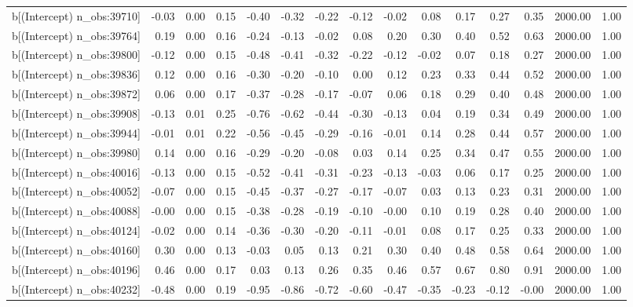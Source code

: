 \begin{table}[ht]
\begin{tabular}{rrrrrrrrrrrrrrr}
  b[(Intercept) n\_obs:39710] & -0.03 & 0.00 & 0.15 & -0.40 & -0.32 & -0.22 & -0.12 & -0.02 & 0.08 & 0.17 & 0.27 & 0.35 & 2000.00 & 1.00 \\ 
  b[(Intercept) n\_obs:39764] & 0.19 & 0.00 & 0.16 & -0.24 & -0.13 & -0.02 & 0.08 & 0.20 & 0.30 & 0.40 & 0.52 & 0.63 & 2000.00 & 1.00 \\ 
  b[(Intercept) n\_obs:39800] & -0.12 & 0.00 & 0.15 & -0.48 & -0.41 & -0.32 & -0.22 & -0.12 & -0.02 & 0.07 & 0.18 & 0.27 & 2000.00 & 1.00 \\ 
  b[(Intercept) n\_obs:39836] & 0.12 & 0.00 & 0.16 & -0.30 & -0.20 & -0.10 & 0.00 & 0.12 & 0.23 & 0.33 & 0.44 & 0.52 & 2000.00 & 1.00 \\ 
  b[(Intercept) n\_obs:39872] & 0.06 & 0.00 & 0.17 & -0.37 & -0.28 & -0.17 & -0.07 & 0.06 & 0.18 & 0.29 & 0.40 & 0.48 & 2000.00 & 1.00 \\ 
  b[(Intercept) n\_obs:39908] & -0.13 & 0.01 & 0.25 & -0.76 & -0.62 & -0.44 & -0.30 & -0.13 & 0.04 & 0.19 & 0.34 & 0.49 & 2000.00 & 1.00 \\ 
  b[(Intercept) n\_obs:39944] & -0.01 & 0.01 & 0.22 & -0.56 & -0.45 & -0.29 & -0.16 & -0.01 & 0.14 & 0.28 & 0.44 & 0.57 & 2000.00 & 1.00 \\ 
  b[(Intercept) n\_obs:39980] & 0.14 & 0.00 & 0.16 & -0.29 & -0.20 & -0.08 & 0.03 & 0.14 & 0.25 & 0.34 & 0.47 & 0.55 & 2000.00 & 1.00 \\ 
  b[(Intercept) n\_obs:40016] & -0.13 & 0.00 & 0.15 & -0.52 & -0.41 & -0.31 & -0.23 & -0.13 & -0.03 & 0.06 & 0.17 & 0.25 & 2000.00 & 1.00 \\ 
  b[(Intercept) n\_obs:40052] & -0.07 & 0.00 & 0.15 & -0.45 & -0.37 & -0.27 & -0.17 & -0.07 & 0.03 & 0.13 & 0.23 & 0.31 & 2000.00 & 1.00 \\ 
  b[(Intercept) n\_obs:40088] & -0.00 & 0.00 & 0.15 & -0.38 & -0.28 & -0.19 & -0.10 & -0.00 & 0.10 & 0.19 & 0.28 & 0.40 & 2000.00 & 1.00 \\ 
  b[(Intercept) n\_obs:40124] & -0.02 & 0.00 & 0.14 & -0.36 & -0.30 & -0.20 & -0.11 & -0.01 & 0.08 & 0.17 & 0.25 & 0.33 & 2000.00 & 1.00 \\ 
  b[(Intercept) n\_obs:40160] & 0.30 & 0.00 & 0.13 & -0.03 & 0.05 & 0.13 & 0.21 & 0.30 & 0.40 & 0.48 & 0.58 & 0.64 & 2000.00 & 1.00 \\ 
  b[(Intercept) n\_obs:40196] & 0.46 & 0.00 & 0.17 & 0.03 & 0.13 & 0.26 & 0.35 & 0.46 & 0.57 & 0.67 & 0.80 & 0.91 & 2000.00 & 1.00 \\ 
  b[(Intercept) n\_obs:40232] & -0.48 & 0.00 & 0.19 & -0.95 & -0.86 & -0.72 & -0.60 & -0.47 & -0.35 & -0.23 & -0.12 & -0.00 & 2000.00 & 1.00 \\ 

\end{tabular}
\end{table}
